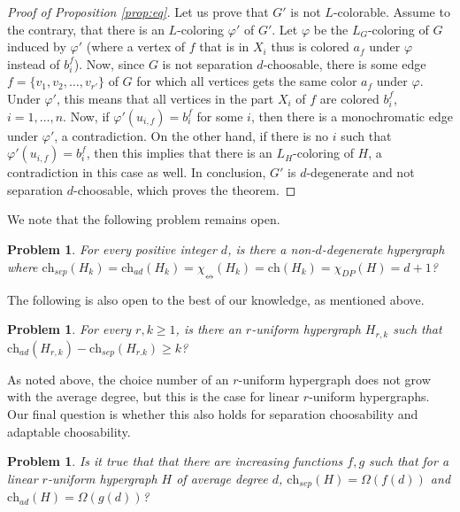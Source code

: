 \documentclass[12pt]{article}
\newtheorem{problem}[theorem]{Problem}
\newcommand{\single}{\chi_{\nleftrightarrow}}
\newcommand{\ch}{\mathrm{ch}}
\newcommand{\1}{\mathds{1}}
\begin{document}
\begin{proof}[Proof of Proposition \ref{prop:eq}]
	Let us prove that $G'$ is not $L$-colorable. Assume to the contrary, that
	there is an $L$-coloring $\varphi'$ of $G'$. 
	Let $\varphi$ be the $L_G$-coloring of $G$ induced by $\varphi'$ (where a vertex of $f$ that is in $X_i$ 
	thus is colored $a_f$ under $\varphi$ instead of $b^f_i$).
	Now, since $G$ is not separation $d$-choosable,
	there is some edge $f =\{v_1,v_2, \dots, v_{r'}\}$ of
	$G$ for which all vertices gets the same color $a_f$ under $\varphi$.
	Under $\varphi'$, this means that all vertices in the part $X_i$ of
	$f$ are colored $b^f_i$, $i=1,\dots, n$.
	Now, if $\varphi'(u_{i,f}) = b^f_i$ for some $i$, then there is a monochromatic
	edge under $\varphi'$, a contradiction. On the other hand, if
	there is no $i$ such that
	$\varphi'(u_{i,f})= b^f_i$, then this implies that there is an $L_H$-coloring
	of $H$, a contradiction in this case as well.
	In conclusion, $G'$ is $d$-degenerate and not separation $d$-choosable,
	which proves the theorem.
	\end{proof}
	

	We note that the following problem remains open.

\begin{problem}
	For every positive integer $d$, is there a non-$d$-degenerate hypergraph where 
	$\ch_{sep}(H_{k}) = \ch_{ad}(H_{k}) = 
		\single(H_{k})= \ch(H_{k}) = \chi_{DP}(H) =d+1$?
\end{problem}
	

The following is also open to the best of our knowledge, as mentioned above.

\begin{problem}
	 For every $r, k \geq 1$, is there an $r$-uniform hypergraph $H_{r,k}$ such that
	$\ch_{ad}(H_{r,k}) - \ch_{sep}(H_{r.k}) \geq k$?
\end{problem}


	

	As noted above, the choice number of an $r$-uniform hypergraph does not grow with the
	average degree, but this is the case for linear $r$-uniform hypergraphs. 
	Our final question
	is whether this also holds for separation choosability and adaptable choosability.

\begin{problem}
	Is it true that that there are increasing functions $f,g$ such that 
	for a linear $r$-uniform hypergraph $H$ of average degree $d$, $\ch_{sep}(H) = \Omega(f(d))$
	and $\ch_{ad}(H) = \Omega(g(d))$?
\end{problem}


\end{document}
